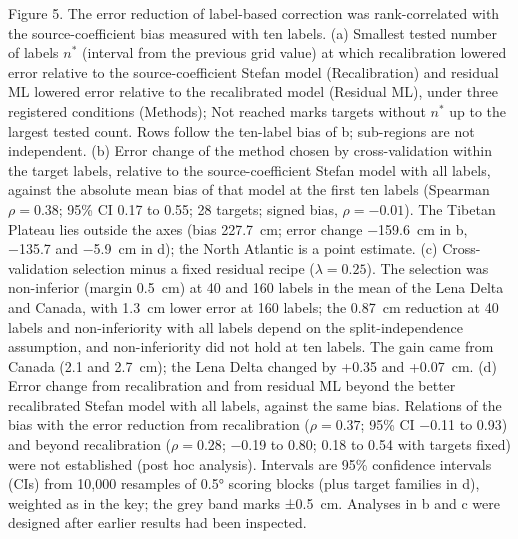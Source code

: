 \noindent Figure 5. The error reduction of label-based correction was rank-correlated with the source-coefficient bias measured with ten labels.
(a) Smallest tested number of labels $n^{*}$ (interval from the previous grid value) at which recalibration lowered error relative to the source-coefficient Stefan model (Recalibration) and residual ML lowered error relative to the recalibrated model (Residual ML), under three registered conditions (Methods); Not reached marks targets without $n^{*}$ up to the largest tested count.
Rows follow the ten-label bias of b; sub-regions are not independent.
(b) Error change of the method chosen by cross-validation within the target labels, relative to the source-coefficient Stefan model with all labels, against the absolute mean bias of that model at the first ten labels (Spearman $\rho = 0.38$; 95\% CI 0.17 to 0.55; 28 targets; signed bias, $\rho = -0.01$).
The Tibetan Plateau lies outside the axes (bias 227.7~cm; error change −159.6~cm in b, −135.7 and −5.9~cm in d); the North Atlantic is a point estimate.
(c) Cross-validation selection minus a fixed residual recipe ($\lambda = 0.25$).
The selection was non-inferior (margin 0.5~cm) at 40 and 160 labels in the mean of the Lena Delta and Canada, with 1.3~cm lower error at 160 labels; the 0.87~cm reduction at 40 labels and non-inferiority with all labels depend on the split-independence assumption, and non-inferiority did not hold at ten labels.
The gain came from Canada (2.1 and 2.7~cm); the Lena Delta changed by +0.35 and +0.07~cm.
(d) Error change from recalibration and from residual ML beyond the better recalibrated Stefan model with all labels, against the same bias.
Relations of the bias with the error reduction from recalibration ($\rho = 0.37$; 95\% CI −0.11 to 0.93) and beyond recalibration ($\rho = 0.28$; −0.19 to 0.80; 0.18 to 0.54 with targets fixed) were not established (post hoc analysis).
Intervals are 95\% confidence intervals (CIs) from 10,000 resamples of 0.5° scoring blocks (plus target families in d), weighted as in the key; the grey band marks ±0.5~cm.
Analyses in b and c were designed after earlier results had been inspected.

